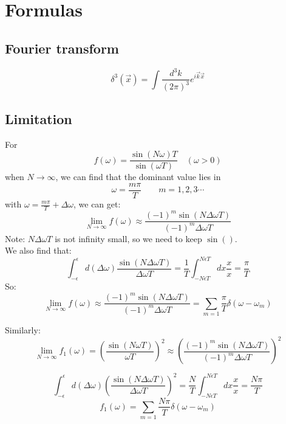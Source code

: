 \section{Formulas}

\subsection{Fourier transform}
\[
    \delta^3(\vec{x})=\int\frac{d^3k}{(2\pi)^3}e^{i\vec{k}\vec{x}}
    \]
\subsection{Limitation}
For 
\[
    f(\omega) = \frac{\sin(N\omega)T}{\sin(\omega T)}   \quad (\omega > 0)
    \]
when $N\rightarrow\infty$, 
we can find that the dominant value lies in 
\[
    \omega = \frac{m\pi}{T} \qquad  m=1,2,3 \cdots
    \]
with $\omega=\frac{m\pi}{T}+\Delta\omega$, we can get:
\begin{equation}
    \displaystyle \lim_{N\rightarrow\infty}f(\omega)\approx\frac{(-1)^m\sin(N\Delta\omega T)}{(-1)^m\Delta\omega T}
\end{equation}
Note: $N\Delta\omega T$ is not infinity small, so we need to keep $\sin()$. \\
We also find that:
\begin{equation}
    \int_{-\epsilon}^{\epsilon}d(\Delta\omega)\frac{\sin(N\Delta\omega T)}{\Delta\omega T}
    =\frac{1}{T}\int_{-N\epsilon T}^{N\epsilon T} dx\frac{x}{x} = \frac{\pi}{T}
\end{equation}
So: 
\begin{equation}
    \displaystyle \lim_{N\rightarrow\infty}f(\omega)\approx\frac{(-1)^m\sin(N\Delta\omega T)}{(-1)^m\Delta\omega T}
    =\displaystyle \sum_{m=1}\frac{\pi}{T}\delta({\omega-\omega_m})
\end{equation}

Similarly:
\begin{equation}
    \displaystyle \lim_{N\rightarrow\infty}f_1(\omega)=\left(\frac{\sin(N\omega T)}{\omega T}\right)^2
    \approx\left(\frac{(-1)^m\sin(N\Delta\omega T)}{(-1)^m\Delta\omega T}\right)^2
\end{equation}

\begin{equation}
    \int_{-\epsilon}^{\epsilon}d(\Delta\omega)\left(\frac{\sin(N\Delta\omega T)}{\Delta\omega T}\right)^2
    =\frac{N}{T}\int_{-N\epsilon T}^{N\epsilon T} dx\frac{x}{x}
    =\frac{N\pi}{T}
\end{equation}
\begin{equation}
    f_1(\omega)=\displaystyle \sum_{m=1}\frac{N\pi}{T}\delta({\omega-\omega_m})
\end{equation}



